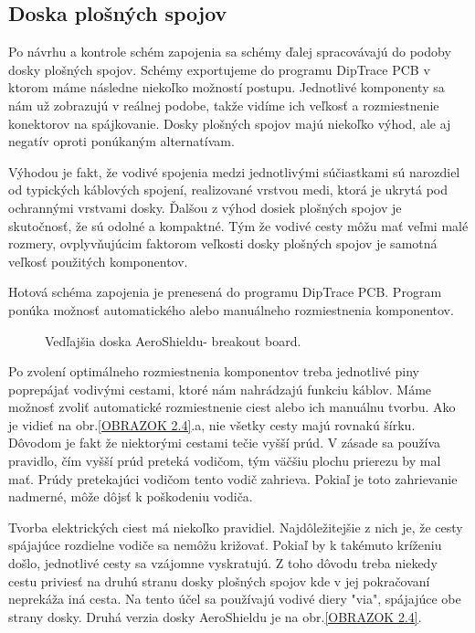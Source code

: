 \subsection{Doska plošných spojov}
\label{PCBcka}

Po návrhu a kontrole schém zapojenia sa schémy ďalej spracovávajú do podoby dosky plošných spojov. Schémy exportujeme do programu DipTrace PCB v ktorom máme následne niekoľko možností postupu. Jednotlivé komponenty sa nám už zobrazujú v reálnej podobe, takže vidíme ich veľkosť a rozmiestnenie konektorov na spájkovanie. Dosky plošných spojov majú niekoľko výhod, ale aj negatív oproti ponúkaným alternatívam\cite{dosky}. 

Výhodou je fakt, že vodivé spojenia medzi jednotlivými súčiastkami sú narozdiel od typických káblových spojení, realizované vrstvou medi, ktorá je ukrytá pod ochrannými vrstvami dosky. Ďalšou z výhod dosiek plošných spojov je skutočnosť, že sú odolné a kompaktné\cite{PCBlife}. Tým že vodivé cesty môžu mať veľmi malé rozmery, ovplyvňujúcim faktorom veľkosti dosky plošných spojov je samotná veľkosť použitých komponentov. 

Hotová schéma zapojenia je prenesená do programu DipTrace PCB. Program ponúka možnosť automatického alebo manuálneho rozmiestnenia komponentov.

\begin{figure}[!tbh]
	\hfill
	\hfill
	\hfill
	\caption{Vedľajšia doska AeroShieldu- breakout board.}\label{OBRAZOK 2.6}
\end{figure}

Po zvolení optimálneho rozmiestnenia komponentov treba jednotlivé piny poprepájať vodivými cestami, ktoré nám nahrádzajú funkciu káblov. Máme možnosť zvoliť automatické rozmiestnenie ciest alebo ich manuálnu tvorbu. Ako je vidieť na obr.\ref{OBRAZOK 2.4}.a, nie všetky cesty majú rovnakú šírku. Dôvodom je fakt že niektorými cestami tečie vyšší prúd. V zásade sa používa pravidlo, čím vyšší prúd preteká vodičom, tým väčšiu plochu prierezu by mal mať. Prúdy pretekajúci vodičom tento vodič zahrieva. Pokiaľ je toto zahrievanie nadmerné, môže dôjsť k poškodeniu vodiča.  

Tvorba elektrických ciest má niekoľko pravidiel. Najdôležitejšie z nich je, že cesty spájajúce rozdielne vodiče sa nemôžu križovať. Pokiaľ by k takémuto kríženiu došlo, jednotlivé cesty sa vzájomne vyskratujú. Z toho dôvodu treba niekedy cestu priviesť na druhú stranu dosky plošných spojov kde v jej pokračovaní neprekáža iná cesta. Na tento účel sa používajú vodivé diery "via", spájajúce obe strany dosky. Druhá verzia dosky AeroShieldu je na obr.\ref{OBRAZOK 2.4}. 



